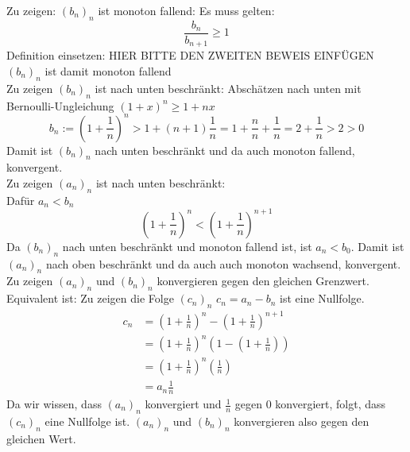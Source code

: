 \documentclass{article}
\begin{document}
    Zu zeigen: \( {(b_n)}_n \) ist monoton fallend:
    Es muss gelten:
    \[ \frac{ b_n }{ b_{n+1} } \geq 1 \]
    Definition einsetzen:
    HIER BITTE DEN ZWEITEN BEWEIS EINFÜGEN
    \( {(b_n)}_n \) ist damit monoton fallend \\

    Zu zeigen \({(b_n)}_n\) ist nach unten beschränkt:
    Abschätzen nach unten mit Bernoulli-Ungleichung \({(1+x)}^n \geq 1 + nx\)
    \[ 
        b_n := { \left( 1 + \frac{1}{n} \right) }^n >
        1 + (n+1) \frac{1}{n} = 
        1 + \frac{n}{n} + \frac{1}{n} =
        2 + \frac{1}{n} > 2 > 0
    \]
    Damit ist \({(b_n)}_n\) nach unten beschränkt und da auch monoton fallend, konvergent. \\
    
    Zu zeigen \({(a_n)}_n\) ist nach unten beschränkt: \\
    Dafür \(a_n < b_n\)
    \[ { \left( 1 + \frac{1}{n} \right) }^n < { \left( 1 + \frac{1}{n} \right) }^{n+1} \]
    Da \({(b_n)}_n\) nach unten beschränkt und monoton fallend ist, ist \(a_n < b_0\).
    Damit ist \({(a_n)}_n\) nach oben beschränkt und da auch auch monoton wachsend, konvergent. \\

    Zu zeigen \({(a_n)}_n\) und \({(b_n)}_n\) konvergieren gegen den gleichen Grenzwert. \\
    Equivalent ist: Zu zeigen die Folge \({(c_n)}_n\) \(c_n = a_n - b_n\) ist eine Nullfolge.
    \begin{align*}
        c_n &= { \left( 1 + \frac{1}{n} \right) }^n - { \left( 1 + \frac{1}{n} \right) }^{n+1} \\
        &= { \left( 1 + \frac{1}{n} \right) }^n \left( 1 - \left( 1 + \frac{1}{n} \right) \right) \\
        &= { \left( 1 + \frac{1}{n} \right) }^n \left( \frac{1}{n} \right) \\
        &= a_n \frac{1}{n}
    \end{align*}
    Da wir wissen, dass \({(a_n)}_n\) konvergiert und \(\frac{1}{n}\) gegen 0 konvergiert, folgt, dass \({(c_n)_n}\)
    eine Nullfolge ist. \({(a_n)}_n\) und \({(b_n)}_n\) konvergieren also gegen den gleichen Wert.
    
\end{document}
